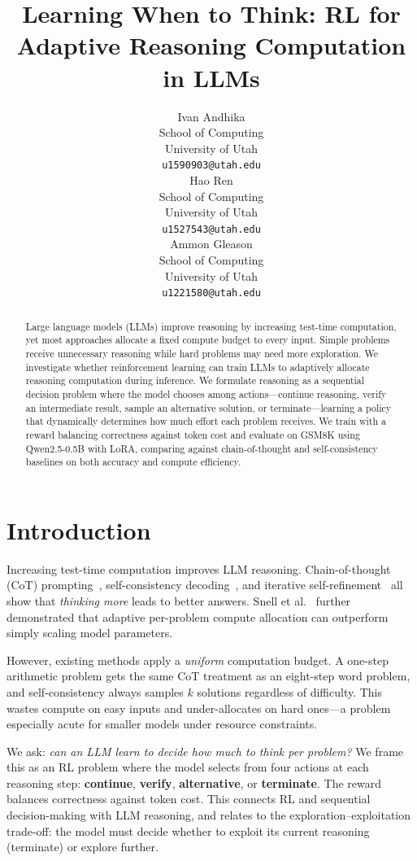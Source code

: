 \documentclass{article}
\title{Learning When to Think: RL for Adaptive Reasoning Computation in LLMs}
\author{%
  Ivan Andhika \\
  School of Computing\\
  University of Utah\\
  \texttt{u1590903@utah.edu} \\
  \And
  Hao Ren \\
  School of Computing\\
  University of Utah\\
  \texttt{u1527543@utah.edu} \\
  \And
  Ammon Gleason \\
  School of Computing\\
  University of Utah\\
  \texttt{u1221580@utah.edu} \\
}
\begin{document}
\maketitle

\begin{abstract}
Large language models (LLMs) improve reasoning by increasing test-time computation, yet most approaches allocate a fixed compute budget to every input. Simple problems receive unnecessary reasoning while hard problems may need more exploration. We investigate whether reinforcement learning can train LLMs to adaptively allocate reasoning computation during inference. We formulate reasoning as a sequential decision problem where the model chooses among actions---continue reasoning, verify an intermediate result, sample an alternative solution, or terminate---learning a policy that dynamically determines how much effort each problem receives. We train with a reward balancing correctness against token cost and evaluate on GSM8K using Qwen2.5-0.5B with LoRA, comparing against chain-of-thought and self-consistency baselines on both accuracy and compute efficiency.
\end{abstract}

\section{Introduction}

Increasing test-time computation improves LLM reasoning. Chain-of-thought (CoT) prompting~\citep{wei2022chainofthought}, self-consistency decoding~\citep{wang2023selfconsistency}, and iterative self-refinement~\citep{kumar2025training} all show that \emph{thinking more} leads to better answers. Snell et al.~\citep{snell2025scaling} further demonstrated that adaptive per-problem compute allocation can outperform simply scaling model parameters.

However, existing methods apply a \emph{uniform} computation budget. A one-step arithmetic problem gets the same CoT treatment as an eight-step word problem, and self-consistency always samples $k$ solutions regardless of difficulty. This wastes compute on easy inputs and under-allocates on hard ones---a problem especially acute for smaller models under resource constraints.

We ask: \emph{can an LLM learn to decide how much to think per problem?} We frame this as an RL problem where the model selects from four actions at each reasoning step: \textbf{continue}, \textbf{verify}, \textbf{alternative}, or \textbf{terminate}. The reward balances correctness against token cost. This connects RL and sequential decision-making with LLM reasoning, and relates to the exploration--exploitation trade-off: the model must decide whether to exploit its current reasoning (terminate) or explore further.
\end{document}
